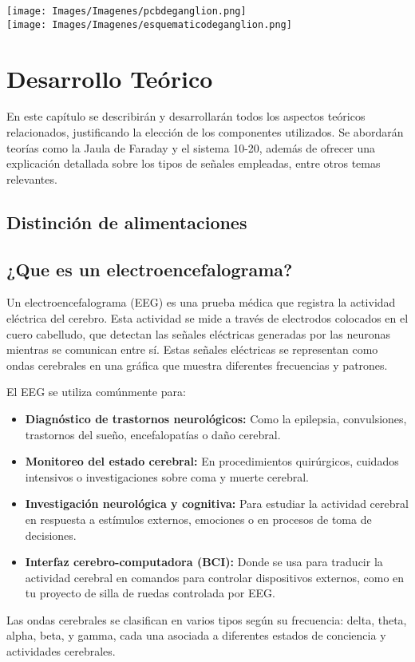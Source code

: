 \documentclass{article}
\begin{document}
\begin{center}
    \texttt{[image: Images/Imagenes/pcbdeganglion.png]}\\

    \texttt{[image: Images/Imagenes/esquematicodeganglion.png]}\\
\end {center}

\section{Desarrollo Teórico}
En este capítulo se describirán y desarrollarán todos los aspectos teóricos relacionados, justificando la elección de los componentes utilizados. Se abordarán teorías como la Jaula de Faraday y el sistema 10-20, además de ofrecer una explicación detallada sobre los tipos de señales empleadas, entre otros temas relevantes.

\subsection{Distinción de alimentaciones}

\subsection{¿Que es un electroencefalograma?}

Un electroencefalograma (EEG) es una prueba médica que registra la actividad eléctrica del cerebro. Esta actividad se mide a través de electrodos colocados en el cuero cabelludo, que detectan las señales eléctricas generadas por las neuronas mientras se comunican entre sí. Estas señales eléctricas se representan como ondas cerebrales en una gráfica que muestra diferentes frecuencias y patrones.

El EEG se utiliza comúnmente para:
\begin{itemize}
    \item \textbf{Diagnóstico de trastornos neurológicos:} Como la epilepsia, convulsiones, trastornos del sueño, encefalopatías o daño cerebral.
    \item \textbf{Monitoreo del estado cerebral:} En procedimientos quirúrgicos, cuidados intensivos o investigaciones sobre coma y muerte cerebral.
    \item \textbf{Investigación neurológica y cognitiva:} Para estudiar la actividad cerebral en respuesta a estímulos externos, emociones o en procesos de toma de decisiones.
    \item \textbf{Interfaz cerebro-computadora (BCI):} Donde se usa para traducir la actividad cerebral en comandos para controlar dispositivos externos, como en tu proyecto de silla de ruedas controlada por EEG.
\end{itemize}
Las ondas cerebrales se clasifican en varios tipos según su frecuencia: delta, theta, alpha, beta, y gamma, cada una asociada a diferentes estados de conciencia y actividades cerebrales.
\end{document}
